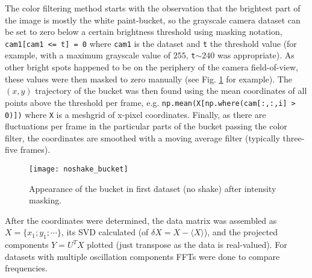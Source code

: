 \documentclass{article}
\begin{document}
The color filtering method starts with the observation that the brightest part of the image is mostly the white paint-bucket, so the grayscale camera dataset can be set to zero below a certain brightness threshold using masking notation, \texttt{cam1[cam1 <= t] = 0} where \texttt{cam1} is the dataset and \texttt{t} the threshold value (for example, with a maximum grayscale value of $255$, \texttt{t}$\sim 240$ was appropriate). As other bright spots happened to be on the periphery of the camera field-of-view, these values were then masked to zero manually (see Fig. \ref{masked_bucket} for example). The $(x,y)$ trajectory of the bucket was then found using the mean coordinates of all points above the threshold per frame, e.g. \texttt{np.mean(X[np.where(cam[:,:,i] > 0)])} where \texttt{X} is a meshgrid of x-pixel coordinates. Finally, as there are fluctuations per frame in the particular parts of the bucket passing the color filter, the coordinates are smoothed with a moving average filter (typically three-five frames).

\begin{figure}[b!]
  \centering
  \texttt{[image: noshake\_bucket]}
  \caption{Appearance of the bucket in first dataset (no shake) after intensity masking.}\label{masked_bucket}
\end{figure}

After the coordinates were determined, the data matrix was assembled as $X = \{x_1; y_1; \cdots\}$, its SVD calculated (of $\delta X=X - \langle X\rangle$), and the projected components $Y = U^TX$ plotted (just transpose as the data is real-valued). For datasets with multiple oscillation components FFTs were done to compare frequencies.

\end{document}
